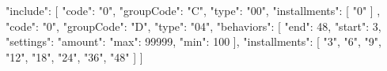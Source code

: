 {
  "include": [
    {
      "code": "0",
      "groupCode": "C",
      "type": "00",
      "installments": [
        "0"
      ]
    },
    {
      "code": "0",
      "groupCode": "D",
      "type": "04",
       "behaviors": [
        {
          "end": 48,
          "start": 3,
          "settings": {
            "amount": {
              "max": 99999,
              "min": 100
            }
          }
        }
      ],
      "installments": [
        "3",
        "6",
        "9",
        "12",
        "18",
        "24",
        "36",
        "48"
      ]
    }
  ]
}